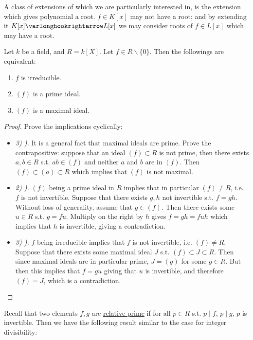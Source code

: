 \documentclass{article}
\begin{document}
\textstart
A class of extensions of which we are particularly interested in, is the extension which gives polynomial a root. $f \in K[x]$ may not have a root; and by extending it $K[x] \ext L[x]$ we may consider roots of $f \in L[x]$ which may have a root.

\begin{proposition}
    Let $k$ be a field, and $R = k[X]$. Let $f \in R \smallsetminus \{0\}$. Then the followings are equivalent:
    \begin{enumerate}[label=\arabic*)]
        \item $f$ is irreducible.
        \item $(f)$ is a prime ideal.
        \item $(f)$ is a maximal ideal.
    \end{enumerate}
\end{proposition}

\begin{proof}
    Prove the implications cyclically:
    \begin{itemize}
        \item \emph{3) ).} It is a general fact that maximal ideals are prime. Prove the contrapositive: suppose that an ideal $(f) \subset R$ is not prime, then there exists $a, b \in R$ s.t. $ab \in (f)$ and neither $a$ and $b$ are in $(f)$. Then $(f) \subset (a) \subset R$ which implies that $(f)$ is not maximal.
        \item \emph{2) ).} $(f)$ being a prime ideal in $R$ implies that in particular $(f) \neq R$, i.e. $f$ is not invertible. Suppose that there exists $g, h$ not invertible s.t. $f = gh$. Without loss of generality, assume that $g \in (f)$. Then there exists some $u \in R$ s.t. $g = fu$. Multiply on the right by $h$ gives $f = gh = fuh$ which implies that $h$ is invertible, giving a contradiction.
        \item \emph{3) ).} $f$ being irreducible implies that $f$ is not invertible, i.e. $(f) \neq R$. Suppose that there exists some maximal ideal $J$ s.t. $(f) \subset J \subset R$. Then since maximal ideals are in particular prime, $J = (g)$ for some $g \in R$. But then this implies that $f = gu$ giving that $u$ is invertible, and therefore $(f) = J$, which is a contradiction.
    \end{itemize}
\end{proof}

\textstart
Recall that two elements $f, g$ are \underline{relative prime} if for all $p \in R$ s.t. $p \mid f$, $p \mid g$, $p$ is invertible. Then we have the following result similar to the case for integer divisibility:
\end{document}
